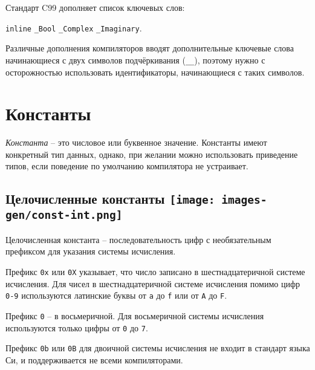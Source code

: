 \documentclass[myc.tex]{subfiles}
\begin{document}
Стандарт C99 дополняет список ключевых слов:

\noindent
\texttt{inline} \texttt{\_Bool} \texttt{\_Complex} \texttt{\_Imaginary}.

Различные дополнения компиляторов вводят дополнительные ключевые слова начинающиеся с двух символов подчёркивания (\texttt{\_\_}), поэтому нужно с осторожностью использовать идентификаторы, начинающиеся с таких символов.






















\section{Константы}


\textit{Константа} -- это числовое или буквенное значение. Константы имеют конкретный тип данных, однако, при желании можно использовать приведение типов, если поведение по умолчанию компилятора не устраивает. 

\subsection[Целочисленные константы]{Целочисленные константы \hfill\texttt{[image: images-gen/const-int.png]}}

Целочисленная константа -- последовательность цифр с необязательным префиксом для указания системы исчисления.

Префикс \texttt{0x} или \texttt{0X} указывает, что число записано в шестнадцатеричной системе исчисления. Для чисел в шестнадцатеричной системе исчисления помимо цифр \texttt{0-9} используются латинские буквы от \texttt{a} до \texttt{f} или от \texttt{A} до \texttt{F}.

Префикс \texttt{0} -- в восьмеричной. Для восьмеричной системы исчисления используются только цифры от \texttt{0} до \texttt{7}.

Префикс \texttt{0b} или \texttt{0B} для двоичной системы исчисления не входит в стандарт языка Си, и поддерживается не всеми компиляторами.
\end{document}
